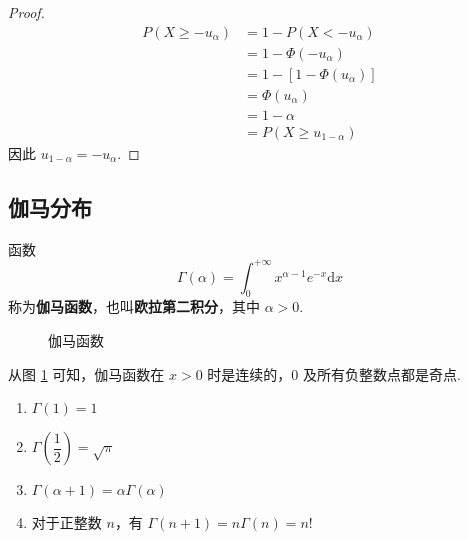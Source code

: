 \begin{proof}
    \vspace{-1em}
    $$
    \begin{aligned}
        P(X \geqslant -u_{\alpha}) &= 1 - P(X < -u_{\alpha}) \\
        &= 1 - \varPhi(-u_{\alpha}) \\
        &= 1 - [1 - \varPhi(u_{\alpha})] \\
        &= \varPhi(u_{\alpha}) \\
        &= 1 - \alpha \\
        &= P(X \geqslant u_{1-\alpha})
    \end{aligned}
    $$
    因此 $u_{1-\alpha} = -u_{\alpha}$.
\end{proof}

\subsection{伽马分布}

\begin{definition}
    \indent 函数
    \begin{equation} \label{equation:gamma}
        \Gamma(\alpha) = \int_{0}^{+\infty} x^{\alpha - 1} e^{-x} \text{d}x
    \end{equation}
    称为\textbf{伽马函数}，也叫\textbf{欧拉第二积分}，其中 $\alpha > 0$.
\end{definition}

\begin{figure}[htbp]
    \centering


    \caption{伽马函数}
    \label{fig:伽马函数}
\end{figure}

从图 \ref{fig:伽马函数} 可知，伽马函数在 $x>0$ 时是连续的，$0$ 及所有负整数点都是奇点.

\begin{property}[][伽马函数的性质]
    \begin{enumerate}
        \item $\Gamma(1) = 1$ \vspace{0.5em}
        \item $\Gamma(\dfrac{1}{2}) = \sqrt{\pi}$ \vspace{0.5em}
        \item $\Gamma(\alpha + 1) = \alpha \Gamma(\alpha)$
        \item 对于正整数 $n$，有 $\Gamma(n+1) = n \Gamma(n) = n!$
    \end{enumerate}
\end{property}

